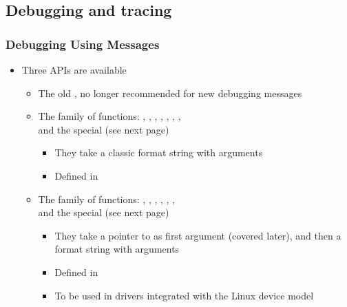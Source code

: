 \subsection{Debugging and tracing}

\begin{frame}
  \frametitle{Debugging Using Messages}
  \begin{itemize}
  \item Three APIs are available
    \begin{itemize}
    \item The old , no longer recommended for new debugging
      messages
    \item The  family of functions: ,
      , , ,
      , , ,
       \\
      and the special  (see next page)
      \begin{itemize}
      \item They take a classic format string with arguments
      \item Defined in 
      \end{itemize}
    \item The  family of functions: ,
      , , ,
      , ,  \\
      and the special  (see next page)
      \begin{itemize}
      \item They take a pointer to  as first
        argument (covered later), and then a format string with
        arguments
      \item Defined in 
      \item To be used in drivers integrated with the Linux device
        model
      \end{itemize}
    \end{itemize}
  \end{itemize}
\end{frame}

